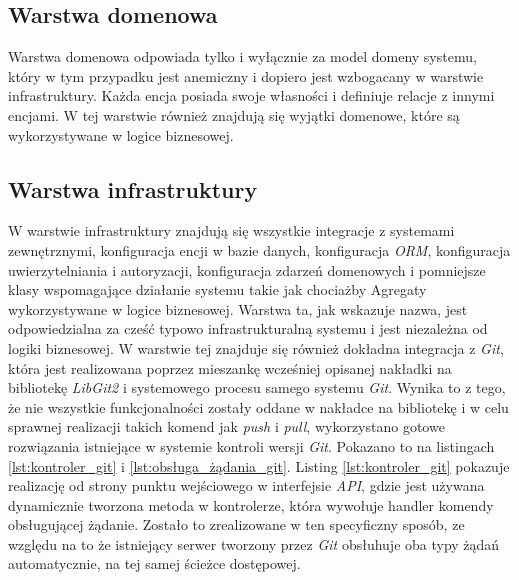\subsection{Warstwa domenowa}
Warstwa domenowa odpowiada tylko i wyłącznie za model domeny systemu, który w tym przypadku jest anemiczny i dopiero jest wzbogacany w warstwie infrastruktury. Każda encja posiada swoje własności
i definiuje relacje z innymi encjami. W tej warstwie również znajdują się wyjątki domenowe, które są wykorzystywane w logice biznesowej.

\subsection{Warstwa infrastruktury}
W warstwie infrastruktury znajdują się wszystkie integracje z systemami zewnętrznymi, konfiguracja encji w bazie danych, konfiguracja \textit{ORM},
konfiguracja uwierzytelniania i autoryzacji, konfiguracja zdarzeń domenowych i pomniejsze klasy wspomagające działanie systemu takie jak chociażby Agregaty wykorzystywane w logice biznesowej.
Warstwa ta, jak wskazuje nazwa, jest odpowiedzialna za cześć typowo infrastrukturalną systemu i jest niezależna od logiki biznesowej.
W warstwie tej znajduje się również dokładna integracja z \textit{Git}, która jest realizowana poprzez mieszankę wcześniej opisanej nakładki na bibliotekę \textit{LibGit2} i
systemowego procesu samego systemu \textit{Git}. Wynika to z tego, że nie wszystkie funkcjonalności zostały oddane w nakładce na bibliotekę i w celu sprawnej realizacji takich komend jak \textit{push} i \textit{pull},
wykorzystano gotowe rozwiązania istniejące w systemie kontroli wersji \textit{Git}. Pokazano to na listingach \ref{lst:kontroler_git} i \ref{lst:obsługa_żądania_git}. Listing \ref{lst:kontroler_git} pokazuje realizację od strony punktu wejściowego w interfejsie \textit{API}, gdzie 
jest używana dynamicznie tworzona metoda w kontrolerze, która wywołuje handler komendy obsługującej żądanie. Zostało to zrealizowane w ten specyficzny sposób, ze względu na to że istniejący serwer tworzony przez \textit{Git} obsłuhuje oba typy żądań
automatycznie, na tej samej ścieżce dostępowej.

